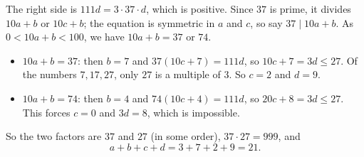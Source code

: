 The right side is $111d=3\cdot37\cdot d$, which is positive. Since $37$ is prime, it divides $10a+b$ or $10c+b$; the equation is symmetric in $a$ and $c$, so say $37\mid10a+b$. As $0<10a+b<100$, we have $10a+b=37$ or $74$.
\begin{itemize}
\item $10a+b=37$: then $b=7$ and $37(10c+7)=111d$, so $10c+7=3d\le27$. Of the numbers $7,17,27$, only $27$ is a multiple of $3$. So $c=2$ and $d=9$.
\item $10a+b=74$: then $b=4$ and $74(10c+4)=111d$, so $20c+8=3d\le27$. This forces $c=0$ and $3d=8$, which is impossible.
\end{itemize}
So the two factors are $37$ and $27$ (in some order), $37\cdot27=999$, and
\[a+b+c+d=3+7+2+9=\boxed{21}.\]
